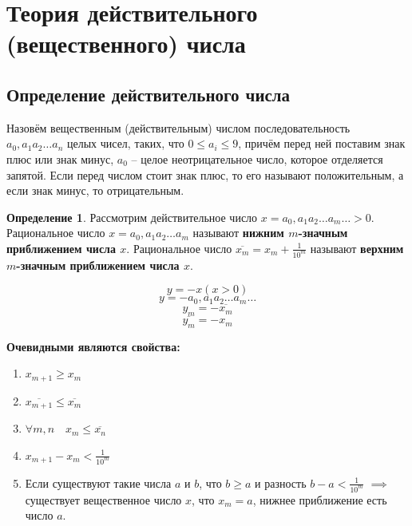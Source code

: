 \documentclass[a4paper,oneside]{article}
\theoremstyle{definition}
\newtheorem{definition}{Определение}[subsection]
\theoremstyle{definition}
\theoremstyle{definition}
\begin{document}
\section{Теория действительного (вещественного) числа}

\subsection{Определение действительного числа}

Назовём вещественным (действительным) числом последовательность
$a_0,a_1 a_2 \dots a_n$ целых чисел, таких, что $0 \le a_i \le 9$,
причём перед ней поставим знак плюс или знак минус,
$a_0$ -- целое неотрицательное число, которое отделяется запятой.
Если перед числом стоит знак плюс, то его называют положительным,
а если знак минус, то отрицательным.

\begin{definition}
    Рассмотрим действительное число $x = a_0,a_1 a_2 \dots a_m \dots > 0$.
    Рациональное число $x = a_0,a_1 a_2 \dots a_m$ называют
    \textbf{нижним $m$-значным приближением числа $x$}.
    Рациональное число $\overline{x_m} = x_m + \frac{1}{10^m}$ называют
    \textbf{верхним $m$-значным приближением числа $x$}.
\end{definition}

\[y = -x (x > 0)\]
\[y = -a_0,a_1 a_2 \dots a_m \dots\]
\[y_m = -\overline{x_m}\]
\[\overline{y_m} = -x_m\]

\textbf{Очевидными являются свойства:}
\begin{enumerate}
    \item $x_{m+1} \ge x_m$
    \item $\overline{x_{m+1}} \le \overline{x_m}$
    \item $\forall m,n \quad x_m \le \overline{x_n}$
    \item $x_{m+1} - x_m < \frac{1}{10^m}$
    \item Если существуют такие числа $a$ и $b$, что $b \ge a$
    и разность $b - a < \frac{1}{10^m}$ $\implies$ существует
    вещественное число $x$, что $x_m = a$, нижнее приближение есть число $a$.
\end{enumerate}
\end{document}
